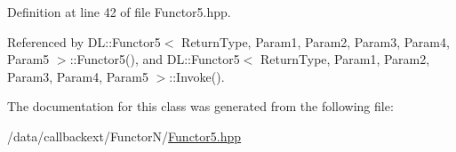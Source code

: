 Definition at line 42 of file Functor5.hpp.

Referenced by DL::Functor5$<$ Return\-Type, Param1, Param2, Param3, Param4, Param5 $>$::Functor5(), and DL::Functor5$<$ Return\-Type, Param1, Param2, Param3, Param4, Param5 $>$::Invoke().

The documentation for this class was generated from the following file:\begin{CompactItemize}
\item 
/data/callbackext/Functor\-N/\hyperlink{Functor5_8hpp}{Functor5.hpp}\end{CompactItemize}
